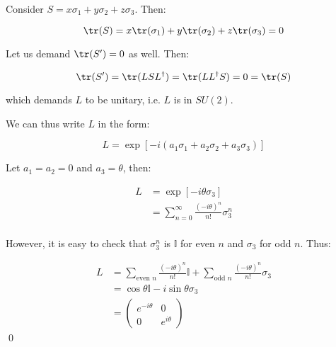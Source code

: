 \documentclass[12pt]{article}
\begin{document}
Consider $S = x\sigma_{1} + y\sigma_{2} + z\sigma_{3}$. Then:

\begin{equation}
    \tr(S) = x\tr(\sigma_{1}) + y\tr(\sigma_{2}) + z\tr(\sigma_{3}) = 0
\end{equation}

Let us demand $\tr(S') = 0$ as well. Then:

\begin{equation}
    \tr(S') = \tr(LSL^{\dagger}) = \tr(LL^{\dagger}S) = 0 = \tr(S)
\end{equation}

which demands $L$ to be unitary, i.e. $L$ is in $SU(2)$.

We can thus write $L$ in the form:

\begin{equation}
    L = \exp[-i(a_{1} \sigma_{1} + a_{2} \sigma_{2} + a_{3} \sigma_{3})]
\end{equation}

Let $a_{1} = a_{2} = 0$ and $a_{3} = \theta$, then:

\begin{equation}
    \begin{split}
        L &= \exp[-i\theta \sigma_{3}] \\
        &= \sum_{n = 0}^{\infty} \frac{(-i\theta)^{n}}{n!} \sigma_{3}^{n} \\
    \end{split}
\end{equation}

However, it is easy to check that $\sigma_{3}^{n}$ is $\mathbb{I}$ for even $n$ and $\sigma_{3}$ for odd $n$. Thus:

\begin{equation}
    \begin{split}
        L &= \sum_{\text{even } n} \frac{(-i\theta)^{n}}{n!} \mathbb{I} + \sum_{\text{odd } n} \frac{(-i\theta)^{n}}{n!} \sigma_{3} \\
        &= \cos{\theta} \mathbb{I} - i\sin{\theta} \sigma_{3} \\
        &=
        \begin{pmatrix}
            e^{-i\theta} & 0           \\
            0            & e^{i\theta}
        \end{pmatrix}
    \end{split}
\end{equation}
\qed
\end{document}

